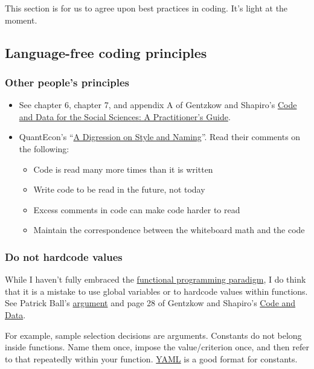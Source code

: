This section is for us to agree upon best practices in coding.
It's light at the moment.

\subsection{Language-free coding principles}

\subsubsection{Other people's principles}

\begin{itemize}
	\item See chapter 6, chapter 7, and appendix A of Gentzkow and Shapiro's \href{https://web.stanford.edu/~gentzkow/research/CodeAndData.pdf}{Code and Data for the Social Sciences: A Practitioner’s Guide}.
	\item QuantEcon's ``\href{https://julia.quantecon.org/getting_started_julia/introduction_to_types.html#A-Digression-on-Style-and-Naming}{A Digression on Style and Naming}''. Read their comments on the following:
	\begin{itemize}
	\item Code is read many more times than it is written
	\item Write code to be read in the future, not today
	\item Excess comments in code can make code harder to read
	\item Maintain the correspondence between the whiteboard math and the code
	\end{itemize}
\end{itemize}

\subsubsection{Do not hardcode values}

While I haven't fully embraced the \href{https://en.wikipedia.org/wiki/Functional_programming}{functional programming paradigm},
I do think that it is a mistake to use global variables or to hardcode values within functions.
See 
Patrick Ball's \href{https://www.youtube.com/watch?v=ZSunU9GQdcI&t=36m43s}{argument} 
and
page 28 of Gentzkow and Shapiro's \href{https://web.stanford.edu/~gentzkow/research/CodeAndData.pdf}{Code and Data}.

For example, sample selection decisions are arguments.
Constants do not belong inside functions.
Name them once, impose the value/criterion once, and then refer to that repeatedly within your function.
\href{http://yaml.org/}{YAML} is a good format for constants.

